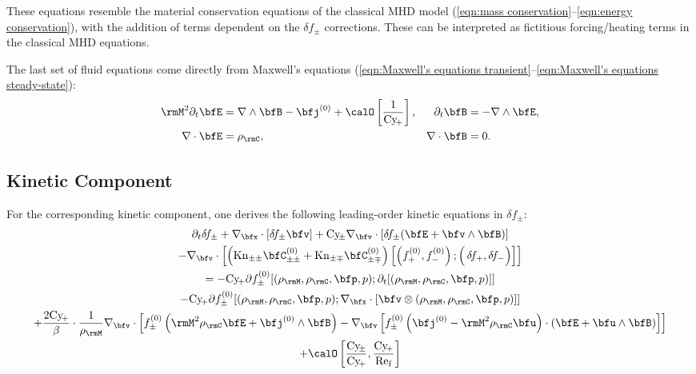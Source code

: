         These equations resemble the material conservation equations of the classical MHD model (\ref{eqn:mass conservation}--\ref{eqn:energy conservation}), with the addition of terms dependent on the $\delta\!f_{\pm}$ corrections. These can be interpreted as fictitious forcing/heating terms in the classical MHD equations.

        \shortline

        The last set of fluid equations come directly from Maxwell's equations (\ref{eqn:Maxwell's equations transient}--\ref{eqn:Maxwell's equations steady-state}):
        \begin{align}
            \rmM^{2}\partial_{t}\bfE  &=  \nabla\wedge\bfB - \bfj^{(0)} + \calO\left[\frac{1}{\rmCy\!_{+}}\right],  &
            \partial_{t}\bfB          &=  - \nabla\wedge\bfE,  \label{eqn:PiC-coupled Maxwell's equations transient}  \\
            \nabla\cdot\bfE           &=  \rho_{\rmC},  &
            \nabla\cdot\bfB           &=  0.  \label{eqn:PiC-coupled Maxwell's equations steady-state}
        \end{align}

    \subsection*{Kinetic Component}
        For the corresponding kinetic component, one derives the following leading-order kinetic equations in $\delta\!f_{\pm}$:
        \begin{multline}\label{eqn:linearized Boltzmann equation}
            \partial_{t}\delta\!f_{\pm} + \nabla_{\bfx}\cdot[\delta\!f_{\pm}\bfv] + \rmCy\!_{\pm}\nabla_{\bfv}\cdot[\delta\!f_{\pm}(\bfE + \bfv\wedge\bfB)]  \\
            - \nabla_{\bfv}\cdot\left[\left(\rmKn_{\pm\pm}\bfC_{\pm\pm}^{(0)} + \rmKn_{\pm\mp}\bfC_{\pm\mp}^{(0)}\right)\left[\left(f_{+}^{(0)}, f_{-}^{(0)}\right); \left({\color{white} f_{+}^{(0)}}\!\!\!\!\!\!\!\!\!\delta\!f_{+}, \delta\!f_{-}\right)\right]\right]  \\
            =  - \rmCy\!_{+}\partial f_{\pm}^{(0)}[(\rho_{\rmM}, \rho_{\rmC}, \bfp, p); \partial_{t}[(\rho_{\rmM}, \rho_{\rmC}, \bfp, p)]]  \\
            - \rmCy\!_{+}\partial f_{\pm}^{(0)}[(\rho_{\rmM}, \rho_{\rmC}, \bfp, p); \nabla_{\bfx}\cdot[\bfv\otimes(\rho_{\rmM}, \rho_{\rmC}, \bfp, p)]]  \\
            + \frac{2\rmCy\!_{+}}{\beta}\cdot\frac{1}{\rho_{\rmM}}\nabla_{\bfv}\cdot\left[f_{\pm}^{(0)}\left(\rmM^{2}\rho_{\rmC}\bfE + \bfj^{(0)}\wedge\bfB\right) - \nabla_{\bfv}\left[f_{\pm}^{(0)}\left(\bfj^{(0)} - \rmM^{2}\rho_{\rmC}\bfu\right)\cdot\left(\bfE + \bfu\wedge\bfB\right)\right]\right]  \\
            + \calO\left[\frac{\rmCy\!_{\pm}}{\rmCy\!_{+}}, \frac{\rmCy\!_{+}}{\rmRef}\right]
        \end{multline}
        
